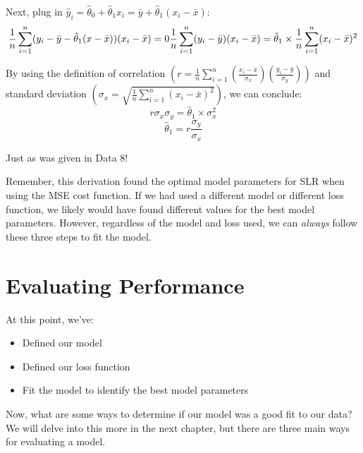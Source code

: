 \documentclass[
  letterpaper,
  DIV=11,
  numbers=noendperiod]{scrreprt}
\providecommand{\tightlist}{%
  \setlength{\itemsep}{0pt}\setlength{\parskip}{0pt}}\usepackage{longtable,booktabs,array}
\begin{document}
Next, plug in
\(\hat{y}_i = \hat{\theta}_0 + \hat{\theta}_1 x_i = \bar{y} + \hat{\theta}_1(x_i - \bar{x})\):
\[
\frac{1}{n} \sum_{i=1}^n (y_i - \bar{y} - \hat{\theta}_1(x - \bar{x}))(x_i - \bar{x}) = 0 \\
\frac{1}{n} \sum_{i=1}^n (y_i - \bar{y})(x_i - \bar{x}) = \hat{\theta}_1 \times \frac{1}{n} \sum_{i=1}^n (x_i - \bar{x})^2
\]

By using the definition of correlation
\(\left(r = \frac{1}{n} \sum_{i=1}^n (\frac{x_i-\bar{x}}{\sigma_x})(\frac{y_i-\bar{y}}{\sigma_y}) \right)\)
and standard deviation
\(\left(\sigma_x = \sqrt{\frac{1}{n} \sum_{i=1}^n (x_i - \bar{x})^2} \right)\),
we can conclude:
\[r \sigma_x \sigma_y = \hat{\theta}_1 \times \sigma_x^2\]
\[\hat{\theta}_1 = r \frac{\sigma_y}{\sigma_x}\]

Just as was given in Data 8!

Remember, this derivation found the optimal model parameters for SLR
when using the MSE cost function. If we had used a different model or
different loss function, we likely would have found different values for
the best model parameters. However, regardless of the model and loss
used, we can \emph{always} follow these three steps to fit the model.

\hypertarget{evaluating-performance}{%
\section{Evaluating Performance}\label{evaluating-performance}}

At this point, we've:

\begin{itemize}
\tightlist
\item
  Defined our model
\item
  Defined our loss function
\item
  Fit the model to identify the best model parameters
\end{itemize}

Now, what are some ways to determine if our model was a good fit to our
data? We will delve into this more in the next chapter, but there are
three main ways for evaluating a model.
\end{document}

